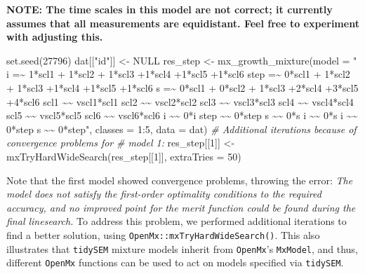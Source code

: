 \documentclass[
  man,floatsintext]{apa6}
\newenvironment{Shaded}{\begin{snugshade}}{\end{snugshade}}
\newcommand{\AttributeTok}[1]{\textcolor[rgb]{0.77,0.63,0.00}{#1}}
\newcommand{\CommentTok}[1]{\textcolor[rgb]{0.56,0.35,0.01}{\textit{#1}}}
\newcommand{\ConstantTok}[1]{\textcolor[rgb]{0.00,0.00,0.00}{#1}}
\newcommand{\DecValTok}[1]{\textcolor[rgb]{0.00,0.00,0.81}{#1}}
\newcommand{\FunctionTok}[1]{\textcolor[rgb]{0.00,0.00,0.00}{#1}}
\newcommand{\NormalTok}[1]{#1}
\newcommand{\OtherTok}[1]{\textcolor[rgb]{0.56,0.35,0.01}{#1}}
\newcommand{\SpecialCharTok}[1]{\textcolor[rgb]{0.00,0.00,0.00}{#1}}
\newcommand{\StringTok}[1]{\textcolor[rgb]{0.31,0.60,0.02}{#1}}
\begin{document}
\textbf{NOTE: The time scales in this model are not correct; it currently assumes that all measurements are equidistant. Feel free to experiment with adjusting this.}

\begin{Shaded}
\begin{Highlighting}[]
\FunctionTok{set.seed}\NormalTok{(}\DecValTok{27796}\NormalTok{)}
\NormalTok{dat[[}\StringTok{"id"}\NormalTok{]] }\OtherTok{\textless{}{-}} \ConstantTok{NULL}
\NormalTok{res\_step }\OtherTok{\textless{}{-}} \FunctionTok{mx\_growth\_mixture}\NormalTok{(}\AttributeTok{model =} \StringTok{"}
\StringTok{  i =\textasciitilde{} 1*scl1 + 1*scl2 + 1*scl3 +1*scl4 +1*scl5 +1*scl6}
\StringTok{  step =\textasciitilde{} 0*scl1 + 1*scl2 + 1*scl3 +1*scl4 +1*scl5 +1*scl6}
\StringTok{  s =\textasciitilde{} 0*scl1 + 0*scl2 + 1*scl3 +2*scl4 +3*scl5 +4*scl6}
\StringTok{  scl1 \textasciitilde{}\textasciitilde{} vscl1*scl1}
\StringTok{  scl2 \textasciitilde{}\textasciitilde{} vscl2*scl2}
\StringTok{  scl3 \textasciitilde{}\textasciitilde{} vscl3*scl3}
\StringTok{  scl4 \textasciitilde{}\textasciitilde{} vscl4*scl4}
\StringTok{  scl5 \textasciitilde{}\textasciitilde{} vscl5*scl5}
\StringTok{  scl6 \textasciitilde{}\textasciitilde{} vscl6*scl6}
\StringTok{  i \textasciitilde{}\textasciitilde{} 0*i}
\StringTok{  step \textasciitilde{}\textasciitilde{} 0*step}
\StringTok{  s \textasciitilde{}\textasciitilde{} 0*s}
\StringTok{  i \textasciitilde{}\textasciitilde{} 0*s}
\StringTok{  i \textasciitilde{}\textasciitilde{} 0*step}
\StringTok{  s \textasciitilde{}\textasciitilde{} 0*step"}\NormalTok{,}
    \AttributeTok{classes =} \DecValTok{1}\SpecialCharTok{:}\DecValTok{5}\NormalTok{, }\AttributeTok{data =}\NormalTok{ dat)}
\CommentTok{\# Additional iterations because of convergence problems for}
\CommentTok{\# model 1:}
\NormalTok{res\_step[[}\DecValTok{1}\NormalTok{]] }\OtherTok{\textless{}{-}} \FunctionTok{mxTryHardWideSearch}\NormalTok{(res\_step[[}\DecValTok{1}\NormalTok{]], }\AttributeTok{extraTries =} \DecValTok{50}\NormalTok{)}
\end{Highlighting}
\end{Shaded}

Note that the first model showed convergence problems, throwing the error:
\emph{The model does not satisfy the
first-order optimality conditions to
the required accuracy, and no improved
point for the merit function could be
found during the final linesearch.}
To address this problem, we performed
additional iterations to\\
find a better solution, using \texttt{OpenMx::mxTryHardWideSearch()}.
This also illustrates that \texttt{tidySEM} mixture models inherit from \texttt{OpenMx}'s \texttt{MxModel},
and thus, different \texttt{OpenMx} functions can be used to act on models specified via \texttt{tidySEM}.
\end{document}
